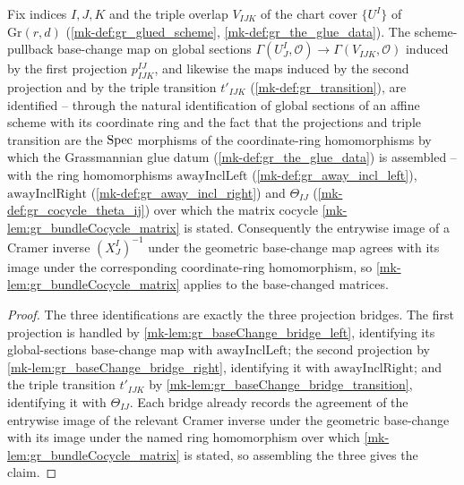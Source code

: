 \begin{lemma}\label{mk-lem:gr_baseChange_bridge}
  \leanok

  Fix indices \(I, J, K\) and the triple overlap \(V_{IJK}\) of the chart cover
  \(\{U^I\}\) of \(\mathrm{Gr}(r,d)\) (\ref{mk-def:gr_glued_scheme}, \ref{mk-def:gr_the_glue_data}).
  The scheme-pullback base-change map on global sections
  \(\Gamma(U^I_J, \mathcal{O}) \to \Gamma(V_{IJK}, \mathcal{O})\) induced by the first projection
  \(p^{IJ}_{IJK}\), and likewise the maps induced by the second projection and by the triple
  transition \(t'_{IJK}\) (\ref{mk-def:gr_transition}), are identified -- through the natural identification of global sections of an affine scheme
  with its coordinate ring and the fact that the projections and triple transition are the
  \(\operatorname{Spec}\) morphisms of the coordinate-ring homomorphisms by which the Grassmannian glue datum
  (\ref{mk-def:gr_the_glue_data}) is assembled -- with the ring homomorphisms
  \(\mathrm{awayInclLeft}\) (\ref{mk-def:gr_away_incl_left}),
  \(\mathrm{awayInclRight}\) (\ref{mk-def:gr_away_incl_right}) and \(\Theta_{IJ}\)
  (\ref{mk-def:gr_cocycle_theta_ij}) over which the matrix cocycle
  \ref{mk-lem:gr_bundleCocycle_matrix} is stated. Consequently the entrywise image of a Cramer
  inverse \((X^I_J)^{-1}\) under the geometric base-change map agrees with its image under the
  corresponding coordinate-ring homomorphism, so \ref{mk-lem:gr_bundleCocycle_matrix} applies
  to the base-changed matrices.
\end{lemma}
\begin{proof}
  The three identifications are exactly the three projection bridges. The first projection is
  handled by \ref{mk-lem:gr_baseChange_bridge_left}, identifying its global-sections base-change
  map with \(\mathrm{awayInclLeft}\); the second projection by
  \ref{mk-lem:gr_baseChange_bridge_right}, identifying it with \(\mathrm{awayInclRight}\); and the
  triple transition \(t'_{IJK}\) by \ref{mk-lem:gr_baseChange_bridge_transition}, identifying it
  with \(\Theta_{IJ}\). Each bridge already records the agreement of the entrywise image of the
  relevant Cramer inverse under the geometric base-change with its image under the named ring
  homomorphism over which \ref{mk-lem:gr_bundleCocycle_matrix} is stated, so assembling the three
  gives the claim.
\end{proof}

